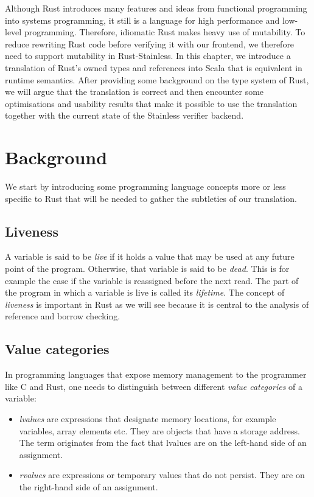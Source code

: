 Although Rust introduces many features and ideas from functional programming
into systems programming, it still is a language for high performance and
low-level programming. Therefore, idiomatic Rust makes heavy use of mutability.
To reduce rewriting Rust code before verifying it with our frontend, we
therefore need to support mutability in Rust-Stainless. In this chapter, we
introduce a translation of Rust's owned types and references into Scala that is
equivalent in runtime semantics. After providing some background on the type
system of Rust, we will argue that the translation is correct and then encounter
some optimisations and usability results that make it possible to use the
translation together with the current state of the Stainless verifier backend.


\section{Background}
We start by introducing some programming language concepts more or less specific
to Rust that will be needed to gather the subtleties of our translation.

\subsection{Liveness}

A variable is said to be \emph{live} if it holds a value that may be
used at any future point of the program.\cite{wiki:live-vars}
Otherwise, that variable is said to be \emph{dead}. This is for example
the case if the variable is reassigned before the next read. The part of
the program in which a variable is live is called its \emph{lifetime}.
The concept of \emph{liveness} is important in Rust as we will see
because it is central to the analysis of reference and borrow checking.

\subsection{Value categories}

In programming languages that expose memory management to the programmer
like C and Rust, one needs to distinguish between different \emph{value
categories} of a variable: \cite{wiki:lvalues}

\begin{itemize}
\tightlist
\item
  \emph{lvalues} are expressions that designate memory locations, for
  example variables, array elements etc. They are objects that have a
  storage address. The term originates from the fact that lvalues are on
  the left-hand side of an assignment.
\item
  \emph{rvalues} are expressions or temporary values that do not
  persist. They are on the right-hand side of an assignment.
\end{itemize}

